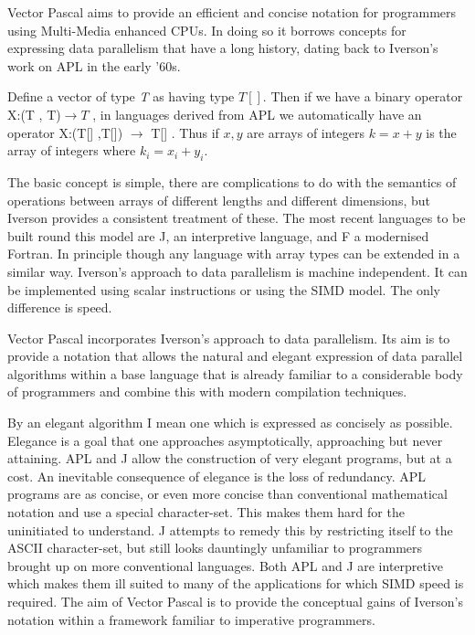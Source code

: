 Vector Pascal aims to provide an efficient and concise notation for programmers
using Multi-Media enhanced CPUs. In doing so it borrows concepts for expressing
data parallelism that have a long history, dating back to Iverson's work on
APL in the early '60s\cite{Iverson62}. 

Define a vector of type \emph{T} as having type $ T[] $. Then if we have
a binary operator  X:(T , T)$\rightarrow T$ , in languages derived
from APL we automatically have an operator  X:(T[] ,T[]) $\rightarrow$ T[]
 . Thus if $ x,y $ are arrays of integers $ k=x+y $ is the array
of integers where $ k_{i}=x_{i}+y_{i} $.

The basic concept is simple, there are complications to do with the semantics
of operations between arrays of different lengths and different dimensions,
but Iverson provides a consistent treatment of these. The most recent languages
to be built round this model are J, an interpretive language\cite{Jmanual}\cite{Burke}\cite{Jintro},
and F\cite{Metcalf96} a modernised Fortran. In principle though
any language with array types can be extended in a similar way. Iverson's approach
to data parallelism is machine independent. It can be implemented using scalar
instructions or using the SIMD model. The only difference is speed. 

Vector Pascal incorporates Iverson's approach to data parallelism. Its aim is
to provide a notation that allows the natural and elegant expression of data
parallel algorithms within a base language that is already familiar to a considerable
body of programmers and combine this with modern compilation techniques. 

By an elegant algorithm I mean one which is expressed as concisely as possible.
Elegance is a goal that one approaches asymptotically, approaching but never
attaining\cite{Chaitin}. APL and J allow the construction of very elegant programs,
but at a cost. An inevitable consequence of elegance is the loss of redundancy.
APL programs are as concise, or even more concise than conventional mathematical
notation\cite{Iverson80} and use a special character-set. This makes them hard
for the uninitiated to understand. J attempts to remedy this by restricting
itself to the ASCII character-set, but still looks dauntingly unfamiliar to
programmers brought up on more conventional languages. Both APL and J are interpretive
which makes them ill suited to many of the applications for which SIMD speed
is required. The aim of Vector Pascal is to provide the conceptual gains of
Iverson's notation within a framework familiar to imperative programmers.

